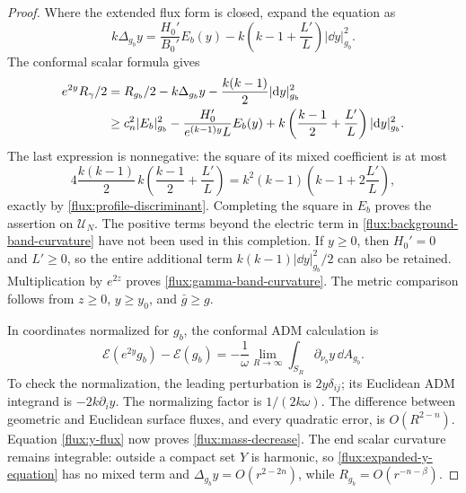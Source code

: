 \begin{proof}
Where the extended flux form is closed, expand the equation as
\begin{equation}
 k\Delta_{g_b}y=
 \frac{H_0'}{B_0'}E_b(y)
 -k\left(k-1+\frac{L'}L\right)|\dd y|_{g_b}^2.
 \label{flux:expanded-y-equation}
\end{equation}
The conformal scalar formula gives
\begin{align}
 e^{2y}R_\gamma/2
 &=R_{g_b}/2-k\Delta_{g_b}y
       -\frac{k(k-1)}2|\mathrm d y|_{g_b}^2\notag\\
 &\geq c_n^2|E_b|_{g_b}^2
 -\frac{H_0'}{e^{(k-1)y}L}E_b(y)
 +k\left(\frac{k-1}{2}+\frac{L'}L\right)|\mathrm d y|_{g_b}^2.
 \label{flux:curvature-quadratic}
\end{align}
The last expression is nonnegative: the square of its mixed coefficient
is at most
\begin{equation}
 4\frac{k(k-1)}2\,
 k\left(\frac{k-1}{2}+\frac{L'}L\right)
 =k^2(k-1)\left(k-1+2\frac{L'}L\right),
 \label{flux:discriminant-check}
\end{equation}
exactly by \eqref{flux:profile-discriminant}.  Completing the square in
$E_b$ proves the assertion on $\mathcal U_N$.  The positive terms beyond
the electric term in \eqref{flux:background-band-curvature} have not been
used in this completion.  If $y\geq0$, then $H_0'=0$ and $L'\geq0$, so the
entire additional term $k(k-1)|\dd y|_{g_b}^2/2$ can also be retained.
Multiplication by $e^{2z}$ proves \eqref{flux:gamma-band-curvature}.
The metric comparison follows from $z\geq0$, $y\geq y_0$, and
$\bar g\geq g$.

In coordinates normalized for $g_b$, the conformal ADM calculation is
\begin{equation}
 \mathcal E(e^{2y}g_b)-\mathcal E(g_b)
 =-\frac1\omega\lim_{R\to\infty}
       \int_{S_R}\partial_{\nu_b}y\,\dd A_{g_b}.
 \label{flux:conformal-energy-formula}
\end{equation}
To check the normalization, the leading perturbation is $2y\delta_{ij}$;
its Euclidean ADM integrand is $-2k\partial_i y$.  The normalizing factor
is $1/(2k\omega)$.  The difference between geometric and Euclidean
surface fluxes, and every quadratic error, is $O(R^{2-n})$.  Equation
\eqref{flux:y-flux} now proves \eqref{flux:mass-decrease}.
The end scalar curvature remains integrable: outside a compact set $Y$ is
harmonic, so \eqref{flux:expanded-y-equation} has no mixed term and
$\Delta_{g_b}y=O(r^{2-2n})$, while $R_{g_b}=O(r^{-n-\beta})$.
\end{proof}

